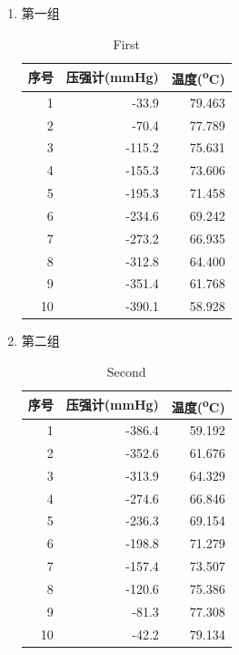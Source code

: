 \documentclass[11pt]{report}
\begin{document}
\begin{enumerate}
\item 第一组
\label{sec:org45804a0}
\begin{table}[htbp]
\caption{First}
\centering
\begin{tabular}{rrr}
序号 & 压强计(mmHg) & 温度(\textsuperscript{o}C)\\
\hline
1 & -33.9 & 79.463\\
2 & -70.4 & 77.789\\
3 & -115.2 & 75.631\\
4 & -155.3 & 73.606\\
5 & -195.3 & 71.458\\
6 & -234.6 & 69.242\\
7 & -273.2 & 66.935\\
8 & -312.8 & 64.400\\
9 & -351.4 & 61.768\\
10 & -390.1 & 58.928\\
\end{tabular}
\end{table}

\item 第二组
\label{sec:org8510fb3}
\begin{table}[htbp]
\caption{Second}
\centering
\begin{tabular}{rrr}
序号 & 压强计(mmHg) & 温度(\textsuperscript{o}C)\\
\hline
1 & -386.4 & 59.192\\
2 & -352.6 & 61.676\\
3 & -313.9 & 64.329\\
4 & -274.6 & 66.846\\
5 & -236.3 & 69.154\\
6 & -198.8 & 71.279\\
7 & -157.4 & 73.507\\
8 & -120.6 & 75.386\\
9 & -81.3 & 77.308\\
10 & -42.2 & 79.134\\
\end{tabular}
\end{table}


\end{enumerate}
\end{document}
